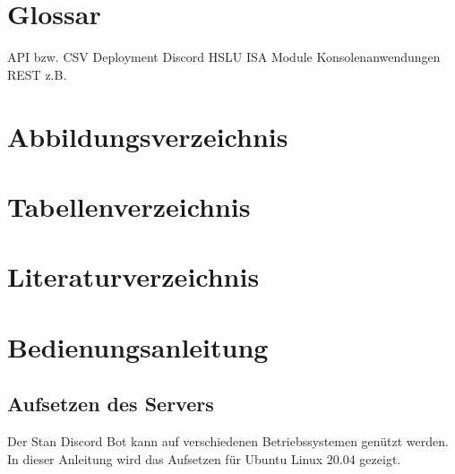 \documentclass[a4paper, table]{article}
\begin{document}
\newpage
\section{Glossar}

API
bzw.
CSV
Deployment
Discord
HSLU
ISA Module
Konsolenanwendungen
REST
z.B.


\section{Abbildungsverzeichnis}
\listoffigures

\section{Tabellenverzeichnis}
\listoftables

\section{Literaturverzeichnis}
\printbibliography

\newpage
\section{Bedienungsanleitung}

\subsection{Aufsetzen des Servers}

Der Stan Discord Bot kann auf verschiedenen Betriebssystemen genützt werden.
In dieser Anleitung wird das Aufsetzen für Ubuntu Linux 20.04 gezeigt.

\end{document}

